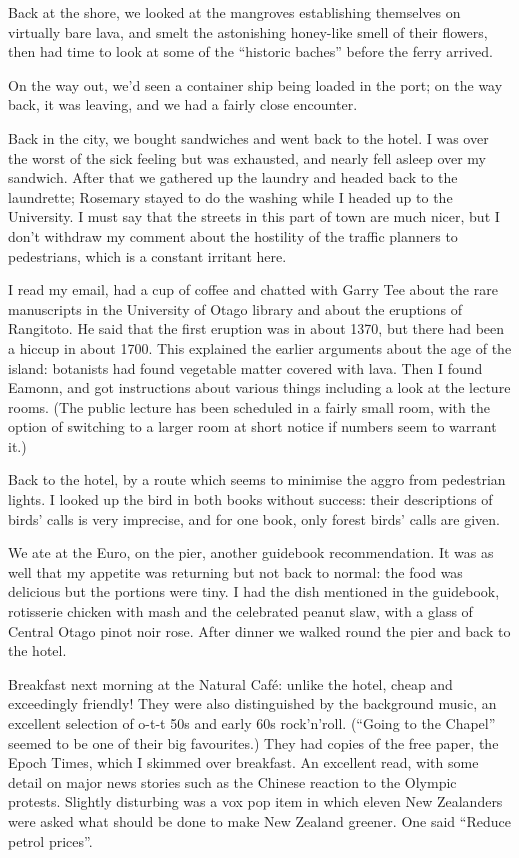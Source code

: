 \documentclass[12pt,a4paper]{article}
\begin{document}
Back at the shore, we looked at the mangroves establishing themselves on
virtually bare lava, and smelt the astonishing honey-like smell of their
flowers, then had time to look at some of the ``historic baches'' before the
ferry arrived.

On the way out, we'd seen a container ship being loaded in the port; on the
way back, it was leaving, and we had a fairly close encounter.

Back in the city, we bought sandwiches and went back to the hotel. I was
over the worst of the sick feeling but was exhausted, and nearly fell asleep
over my sandwich. After that we gathered up the laundry and headed back to
the laundrette; Rosemary stayed to do the washing while I headed up to the
University. I must say that the streets in this part of town are much nicer,
but I don't withdraw my comment about the hostility of the traffic planners
to pedestrians, which is a constant irritant here.

I read my email, had a cup of coffee and chatted with Garry Tee about the
rare manuscripts in the University of Otago library and about the eruptions
of Rangitoto. He said that the first eruption was in about 1370, but there
had been a hiccup in about 1700. This explained the earlier arguments about
the age of the island: botanists had found vegetable matter covered with
lava. Then I found Eamonn, and got instructions about various things 
including a look at the lecture rooms. (The public lecture has been
scheduled in a fairly small room, with the option of switching to a larger
room at short notice if numbers seem to warrant it.)

Back to the hotel, by a route which seems to minimise the aggro from
pedestrian lights. I looked up the bird in both books without success:
their descriptions of birds' calls is very imprecise, and for one book,
only forest birds' calls are given.

We ate at the Euro, on the pier, another guidebook recommendation. It was
as well that my appetite was returning but not back to normal: the food
was delicious but the portions were tiny. I had the dish mentioned in the
guidebook, rotisserie chicken with mash and the celebrated peanut slaw,
with a glass of Central Otago pinot noir rose. After dinner we walked
round the pier and back to the hotel.

Breakfast next morning at the Natural Caf\'e: unlike the hotel, cheap and
exceedingly friendly! They were also distinguished by the background music,
an excellent selection of o-t-t 50s and early 60s rock'n'roll. (``Going to
the Chapel'' seemed to be one of their big favourites.)
They had copies of the free paper, the Epoch Times,
which I skimmed over breakfast. An excellent read, with some detail on
major news stories such as the Chinese reaction to the Olympic protests.
Slightly disturbing was a vox pop item in which eleven New Zealanders were
asked what should be done to make New Zealand greener. One said ``Reduce
petrol prices''.
\end{document}
